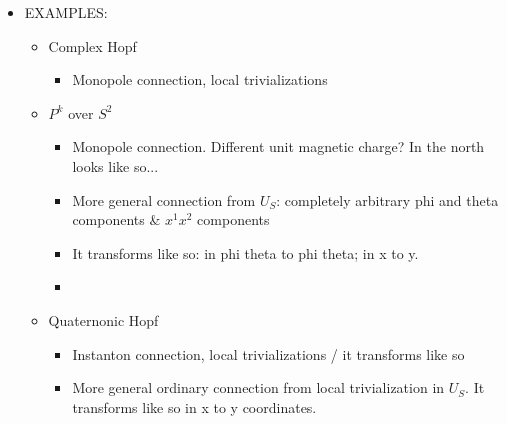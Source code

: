 {\begin{itemize}
\begin{itemize}
        \item Local trivialization of curvature given background connection.
            
        \end{itemize}
        
        
    \item EXAMPLES:
    
        \begin{itemize}
            
        \item Complex Hopf
        
            \begin{itemize}
            \item Monopole connection, local trivializations 
            \end{itemize}
        
        \item $P^k$ over $S^2$
        
            \begin{itemize}
                
            \item Monopole connection. Different unit magnetic charge? In the north looks like so...
            
            \item More general connection from $U_S$: completely arbitrary phi and theta components \& $x^1 x^2$ components

            \item It transforms like so: in phi theta to phi theta; in x to y.
            
            \item {}

            \end{itemize}
            
        \item Quaternonic Hopf
        
            \begin{itemize}
            
            \item Instanton connection, local trivializations / it transforms like so

            \item More general ordinary connection from local trivialization in $U_S$. It transforms like so in x to y coordinates.


\end{itemize}
\end{itemize}
\end{itemize}}
